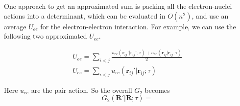 \documentclass[aps,prl,reprint,groupedaddress]{revtex4-1}
\begin{document}
One approach to get an approximated sum is packing all the electron-nuclei actions into a determinant, which can be evaluated in $O(n^2)$, and use an average $U_{ee}$ for the electron-electron interaction.
For example, we can use the following two approximated $U_{ee}$.
\begin{center}
\begin{eqnarray}
U_{ee} = \sum\limits_{i<j}
\frac{u_{ee}(\bm{r}_{ij}'|\bm{r}_{ij}';\tau) + u_{ee}(\bm{r}_{ij}|\bm{r}_{ij};\tau)}{2}\\
U_{ee} = \sum\limits_{i<j}u_{ee}(\bm{r}_{ij}'|\bm{r}_{ij};\tau)
\end{eqnarray}
\end{center}
Here $u_{ee}$ are the pair action.
So the overall $G_2$ becomes
\begin{equation}
\label{eq:G2pppUee}
G_2(\bm{R'}|\bm{R};\tau) =
\end{equation}

\subsection{}
\subsubsection{}


%
\end{document}
